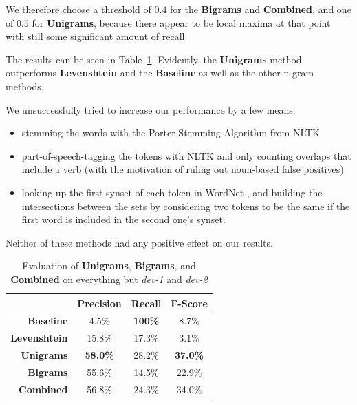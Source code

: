 \documentclass[a4paper,10pt]{scrartcl}
\theoremstyle{style}
\begin{document}
We therefore choose a threshold of $0.4$ for the \textbf{Bigrams} and \textbf{Combined}, and one of $0.5$ for \textbf{Unigrams}, because there appear to be local maxima at that point with still some significant amount of recall.

The results can be seen in Table~\ref{eval_redundancy}. Evidently, the \textbf{Unigrams} method outperforms \textbf{Levenshtein} and the \textbf{Baseline} as well as the other n-gram methods.

We unsuccessfully tried to increase our performance by a few means:

\begin{itemize}
\item stemming the words with the Porter Stemming Algorithm \citep{porter1980algorithm} from NLTK \citep{bird2009natural}
\item part-of-speech-tagging the tokens with NLTK and only counting overlaps that include a verb (with the motivation of ruling out noun-based false positives)
\item looking up the first synset of each token in WordNet \citep{fellbaum2005wordnet}, and building the intersections between the sets by considering two tokens to be the same if the first word is included in the second one's synset.
\end{itemize}

Neither of these methods had any positive effect on our results.

\begin{table}
\begin{center}
\begin{tabular}{r|c|c|c|}
& Precision & Recall & F-Score \\
\hline
\textbf{Baseline} & 4.5\% & \textbf{100\%} & 8.7\% \\
\hline
\textbf{Levenshtein} & 15.8\% & 17.3\% & 3.1\% \\
\hline
\textbf{Unigrams} & \textbf{58.0\%} & 28.2\% & \textbf{37.0\%} \\
\hline
\textbf{Bigrams} & 55.6\% & 14.5\% & 22.9\% \\
\hline
\textbf{Combined} & 56.8\% & 24.3\% & 34.0\% \\
\hline
\end{tabular}
\end{center}
\caption{Evaluation of \textbf{Unigrams}, \textbf{Bigrams}, and \textbf{Combined} on everything but \textit{dev-1} and \textit{dev-2}}
\label{eval_redundancy}
\end{table}
\end{document}
